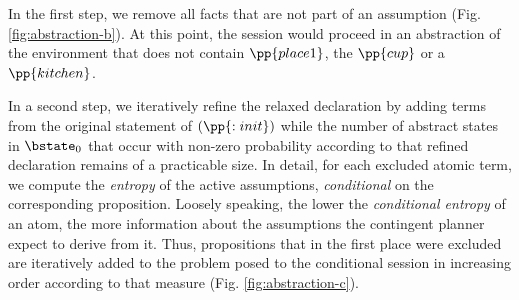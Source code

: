 


In the first step, we remove all facts that are not part of an
assumption (Fig. \ref{fig:abstraction-b}). At this point, the session
would proceed in an abstraction of the environment that does not
contain $\pp{place1}$, the $\pp{cup}$ or a $\pp{kitchen}$. 

In a second step, we iteratively refine the relaxed declaration by
adding terms from the original statement of $(\pp{:init})$ while the
number of abstract states in $\bstate_0$ that occur with non-zero
probability according to that refined declaration remains of a
practicable size. In detail, for each excluded atomic term, we compute
the {\em entropy} of the active assumptions, {\em conditional} on the
corresponding proposition.  Loosely speaking, the lower the {\em
  conditional entropy} of an atom, the more information about the
assumptions the contingent planner expect to derive from it. Thus,
propositions that in the first place were excluded are iteratively
added to the problem posed to the conditional session in increasing
order according to that measure (Fig. \ref{fig:abstraction-c}).





